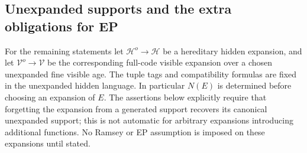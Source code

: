 \subsection{Unexpanded supports and the extra obligations for EP}

For the remaining statements let $\mathcal H^o\to\mathcal H$ be a
hereditary hidden expansion, and let $\mathcal V^o\to\mathcal V$ be the
corresponding full-code visible expansion over a chosen unexpanded fine
visible age. The tuple tags and compatibility formulas are fixed in the
unexpanded hidden language. In particular $N(E)$ is determined before
choosing an expansion of $E$. The assertions below explicitly require
that forgetting the expansion from a generated support recovers its
canonical unexpanded support; this is not automatic for arbitrary
expansions introducing additional functions. No Ramsey or EP assumption
is imposed on these expansions until stated.

